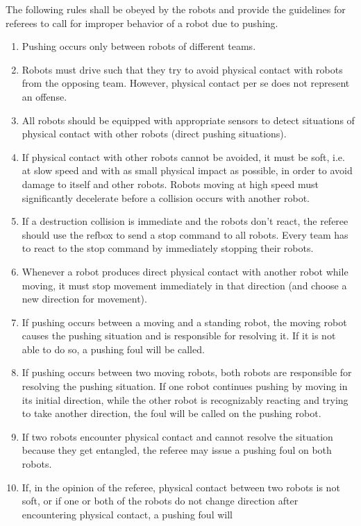 \documentclass[12pt,twoside]{article}
\begin{document}
The following rules shall be obeyed by the robots and provide the
guidelines for referees to call for improper behavior of a robot due
to pushing.

\begin{enumerate}
\item Pushing occurs only between robots of different teams.
\item Robots must drive such that they try to avoid physical contact
  with robots from the opposing team. However, physical contact per se
  does not represent an offense.
\item All robots should be equipped with appropriate sensors to detect 
situations of physical contact with other robots (direct pushing situations).
\item If physical contact with other robots cannot be avoided, it must
  be soft, i.e. at slow speed and with as small physical impact as
  possible, in order to avoid damage to itself and other
  robots. Robots moving at high speed must significantly decelerate
  before a collision occurs with another robot.
\item If a destruction collision is immediate and the robots don't
  react, the referee should use the refbox to send a stop command to
  all robots. Every team has to react to the stop command by
  immediately stopping their robots.
\item Whenever a robot produces direct physical contact with another
  robot while moving, it must stop movement immediately in that
  direction (and choose a new direction for movement).
\item If pushing occurs between a moving and a standing robot, the
  moving robot causes the pushing situation and is responsible for
  resolving it. If it is not able to do so, a pushing foul will be
  called.
\item If pushing occurs between two moving robots, both robots are
  responsible for resolving the pushing situation. If one robot
  continues pushing by moving in its initial direction, while the
  other robot is recognizably reacting and trying to take another
  direction, the foul will be called on the pushing robot.
\item If two robots encounter physical contact and cannot resolve the
  situation because they get entangled, the referee may issue a
  pushing foul on both robots.
\item If, in the opinion of the referee, physical contact between two
  robots is not soft, or if one or both of the robots do not change
  direction after encountering physical contact, a pushing foul will

\end{enumerate}
\end{document}
